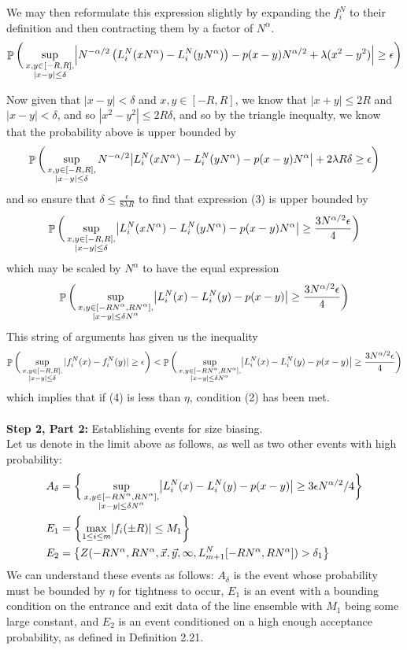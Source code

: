 \documentclass[12pt]{article}
\DeclareMathOperator{\pr}{\mathbb{P}}
\DeclarePairedDelimiter\abs{\lvert}{\rvert}
\begin{document}
 We may then reformulate this expression slightly by expanding the $f_i^N$ to their definition and then contracting them by a factor of $N^\alpha$. 
\begin{align}
\pr\bigg(\sup_{\substack{x,y\in [-R,R],\\ |x-y|\leq\delta}} \abs*{N^{-\alpha/2}\left(L^N_i(xN^{\alpha}) - L^N_i(yN^\alpha)\right)-p(x-y)N^{\alpha/2}+\lambda(x^2-y^2)} \geq \epsilon\bigg)
\end{align}

Now given that $|x-y|<\delta$ and $x,y\in [-R,R]$, we know that $|x+y|\leq 2R$ and $|x-y|<\delta$, and so $|x^2-y^2|\leq 2R\delta$, and so by the triangle inequalty, we know that the probability above is upper bounded by 
\[
\pr\bigg(\sup_{\substack{x,y\in [-R,R],\\ |x-y|\leq\delta}} N^{-\alpha/2}\abs*{L_i^N(xN^\alpha)-L_i^N(yN^\alpha)-p(x-y)N^\alpha}+2\lambda R\delta\geq \epsilon\bigg)
\]
and so ensure that $\delta\leq \frac{\epsilon}{8\lambda R}$ to find that expression (3) is upper bounded by 
\[
\pr\bigg(\sup_{\substack{x,y\in [-R,R],\\ |x-y|\leq\delta}} \abs*{L_i^N(xN^\alpha)-L_i^N(yN^\alpha)-p(x-y)N^\alpha}\geq \frac{3N^{\alpha/2}\epsilon}4\bigg)
\]
which may be scaled by $N^\alpha$ to have the equal expression
\begin{align}
\pr\bigg(\sup_{\substack{x,y\in [-RN^\alpha,RN^\alpha],\\ |x-y|\leq \delta N^\alpha}} \abs*{L_i^N(x)-L_i^N(y)-p(x-y)}\geq \frac{3N^{\alpha/2}\epsilon}4\bigg)
\end{align}
This string of arguments has given us the inequality 
\[
\pr\bigg(\sup_{\substack{x,y\in [-R,R],\\ |x-y|\leq\delta}} |f^N_i(x) - f^N_i(y)| \geq \epsilon\bigg)<\pr\bigg(\sup_{\substack{x,y\in [-RN^\alpha,RN^\alpha],\\ |x-y|\leq \delta N^\alpha}} \abs*{L_i^N(x)-L_i^N(y)-p(x-y)}\geq \frac{3N^{\alpha/2}\epsilon}4\bigg)
\]
which implies that if (4) is less than $\eta$, condition (2) has been met. 
\\\\\noindent \textbf{Step 2, Part 2:} Establishing events for size biasing.\\
Let us denote in the limit above as follows, as well as two other events with high probability:
\begin{align*}
A_\delta&=\bigg\{\sup_{\substack{x,y\in [-RN^\alpha ,RN^\alpha],\\ |x-y|\leq\delta N^{\alpha}}} \abs*{L_i^N(x)-L_i^N(y)-p(x-y)}\geq 3\epsilon N^{\alpha/2}/4\bigg\}\\
E_1&=\left\{\max_{1\leq i \leq m}\abs*{f_i(\pm R)}\leq M_1\right\}\\
E_2&=\left\{Z(-RN^\alpha, RN^\alpha, \vec x, \vec y, \infty, L_{m+1}^N[-RN^\alpha, RN^\alpha])>\delta_1\right\}
\end{align*}
We can understand these events as follows: $A_\delta$ is the event whose probability must be bounded by $\eta$ for tightness to occur, $E_1$ is an event with a bounding condition on the entrance and exit data of the line ensemble with $M_1$ being some large constant, and $E_2$ is an event conditioned on a high enough acceptance probability, as defined in Definition 2.21.
\end{document}
